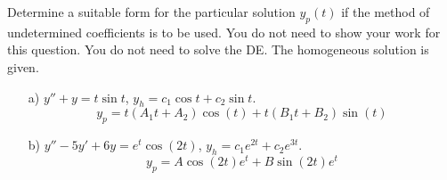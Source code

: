 \ifnum {}
\question[3] 
Determine a suitable form for the particular solution $y_p(t)$ if the method of undetermined coeﬃcients is to be used. You do not need to show your work for this question. You do not need to solve the DE. The homogeneous solution is given. 
\begin{enumerate}
    \item[a)] $y''+y = t\sin t$, $y_h = c_1\cos t + c_2 \sin t$.
    \ifnum {} {\color{DarkBlue} \\
    $$y_p =  t(A_1t+A_2)\cos(t) +  t(B_1t+B_2)\sin(t) $$
    } 
    \else 
    \vspace{6cm}
    \fi       
    \item[b)] $y'' - 5y' + 6y = e^t \cos(2t)$, $y_h = c_1e^{2t} + c_2 e^{3t}$. 
    \ifnum {} {\color{DarkBlue} \\
    $$y_p = A\cos(2t)e^{t} + B\sin(2t)e^{t}$$
    } 
    \else 
    \vspace{6cm}
    \fi    
\end{enumerate}
\fi



